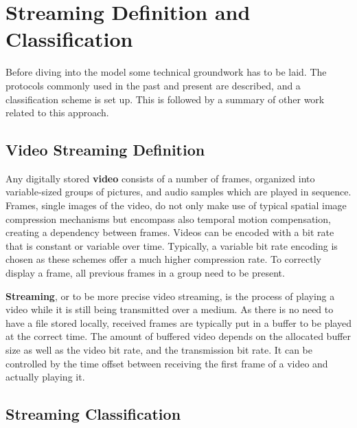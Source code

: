 \section{Streaming Definition and Classification}
\label{c3:sec:background}

Before diving into the model some technical groundwork has to be laid. The protocols commonly used in the past and present are described, and a classification scheme is set up. This is followed by a summary of other work related to this approach.


\subsection{Video Streaming Definition} 

Any digitally stored \textbf{video} consists of a number of frames, organized into variable-sized groups of pictures, and audio samples which are played in sequence. Frames, single images of the video, do not only make use of typical spatial image compression mechanisms but encompass also temporal motion compensation, creating a dependency between frames. Videos can be encoded with a bit rate that is constant or variable over time. Typically, a variable bit rate encoding is chosen as these schemes offer a much higher compression rate. To correctly display a frame, all previous frames in a group need to be present. 

\textbf{Streaming}, or to be more precise video streaming, is the process of playing a video while it is still being transmitted over a medium. 
As there is no need to have a file stored locally, received frames are typically put in a buffer to be played at the correct time. The amount of buffered video depends on the allocated buffer size as well as the video bit rate, and the transmission bit rate. It can be controlled by the time offset between receiving the first frame of a video and actually playing it.


\subsection{Streaming Classification}

